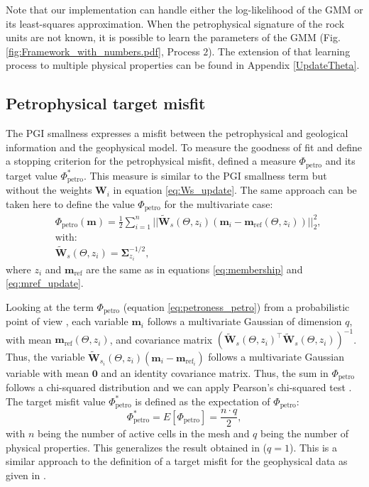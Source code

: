 \documentclass[extra, mreferee]{gji_joint} %
\begin{document}
Note that our implementation can handle either the log-likelihood of the GMM or its least-squares approximation. When the petrophysical signature of the rock units are not known, it is possible to learn the parameters of the GMM \citep{ggz389} (Fig. \ref{fig:Framework_with_numbers.pdf}, Process $2$). The extension of that learning process to multiple physical properties can be found in Appendix \ref{UpdateTheta}.

\subsection{Petrophysical target misfit} \label{sec:target}

The PGI smallness expresses a misfit between the petrophysical and geological information and the geophysical model. To measure the goodness of fit and define a stopping criterion for the petrophysical misfit, \citet{ggz389} defined a measure $\Phi_{\text{petro}}$ and its target value $\Phi_{\text{petro}}^*$. This measure is similar to the PGI smallness term but without the weights $\mathbf{W}_i$ in equation \eqref{eq:Ws_update}. The same approach can be taken here to define the value $\Phi_{\text{petro}}$ for the multivariate case:
\begin{align}
&\Phi_{\text{petro}}(\mathbf{m}) = \frac{1}{2}\sum_{i=1}^n||\mathbf{\tilde{W}}_{s}(\Theta, z_i)(\mathbf{m}_i-\mathbf{m}_{\text{ref}}(\Theta, z_i))||_2^2 \label{eq:petroness_petro},\\
&\text{with: } \nonumber \\
&\mathbf{\tilde{W}}_{s}(\Theta, z_i) = \mathbf{\Sigma}_{z_i}^{-1/2},
\end{align}
where $z_i$ and $\mathbf{m}_{\text{ref}}$ are the same as in equations \eqref{eq:membership} and \eqref{eq:mref_update}.

Looking at the term $\Phi_{\text{petro}}$ (equation \eqref{eq:petroness_petro}) from a probabilistic point of view \citep{Tarantola,ggz389}, each variable $\mathbf{m}_i$ follows a multivariate Gaussian of dimension $q$, with mean $\mathbf{m}_{\text{ref}}(\Theta, z_i)$, and covariance matrix $\left(\mathbf{\tilde{W}}_{s}(\Theta, z_i)^\top \mathbf{\tilde{W}}_{s}(\Theta, z_i)\right)^{-1}$. Thus, the variable $\mathbf{\tilde{W}}_{s_i}(\Theta, z_i)(\mathbf{m}_i-\mathbf{m}_{\text{ref}_i})$ follows a multivariate Gaussian variable with mean $\mathbf{0}$ and an identity covariance matrix. Thus, the sum in $\Phi_{\text{petro}}$ follows a chi-squared distribution and we can apply Pearson's chi-squared test \citep{Pearson1900}. The target misfit value $\Phi_{\text{petro}}^*$ is defined as the expectation of $\Phi_{\text{petro}}$:
\begin{equation}
 \Phi_{\text{petro}}^* = E[\Phi_{\text{petro}}] = \frac{n\cdot q}{2} \label{eq:petrotarget},
\end{equation}
with $n$ being the number of active cells in the mesh and $q$ being the number of physical properties. This generalizes the result obtained in \citet{ggz389} ($q=1$). This is a similar approach to the definition of a target misfit for the geophysical data as given in \citet{Parker}.
\end{document}
